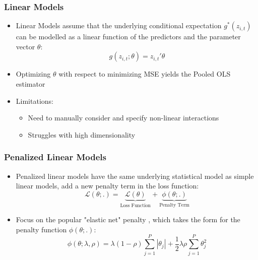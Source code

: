 \documentclass[]{beamer}
\begin{document}

\begin{frame}
\frametitle{Linear Models}
\begin{itemize}
	\item Linear Models assume that the underlying conditional expectation \( g^*(z_{i, t}) \) can be modelled as a linear function of the predictors and the parameter vector \( \theta \):
	\begin{equation}
	g(z_{i, t};\theta) = z_{i, t}' \theta
	\end{equation}
	\item Optimizing $\theta$ with respect to minimizing MSE yields the Pooled OLS estimator
	\item Limitations:
	\begin{itemize}
		\item Need to manually consider and specify non-linear interactions
		\item Struggles with high dimensionality
	\end{itemize}
\end{itemize}
\end{frame}


\begin{frame}
\frametitle{Penalized Linear Models}
\begin{itemize}
	\item Penalized linear models have the same underlying statistical model as simple linear models, add a new penalty term in the loss function:
	\begin{equation}
	\mathcal{L(\theta;.)} = 
	\underset{\text{Loss Function}}{\underbrace{\mathcal{L(\theta)}}} + 
	\underset{\text{Penalty Term}}{\underbrace{\phi(\theta;.)}}
	\end{equation}
	\item Focus on the popular "elastic net" penalty  \citep{zou_regularization_2005}, which takes the form for the penalty function \( \phi(\theta;.) \):
	\begin{equation}
	\phi(\theta;\lambda,\rho) = 
	\lambda(1-\rho) \sum_{j = 1}^{P}|\theta_j| +
	\frac{1}{2} \lambda \rho \sum_{j = 1}^{P}\theta_j^2
	\end{equation}
\end{itemize}
\end{frame}
\end{document}
